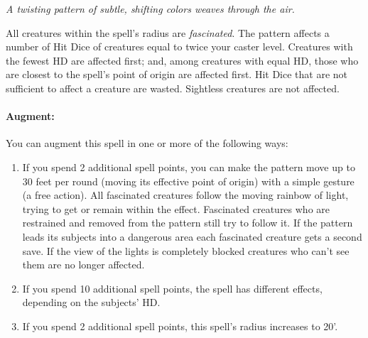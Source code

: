 \emph{A twisting pattern of subtle, shifting colors weaves through the air.}

All creatures within the spell's radius are \emph{fascinated}. 
The pattern affects a number of Hit Dice of creatures equal to twice your caster level. 
Creatures with the fewest HD are affected first; and, among creatures with equal HD, those who are closest to the spell's point of origin are affected first. 
Hit Dice that are not sufficient to affect a creature are wasted. 
Sightless creatures are not affected.

\paragraph{Augment:} You can augment this spell in one or more of the following ways:
\begin{enumerate}
 \item If you spend 2 additional spell points, you can make the pattern move up to 30 feet per round (moving its effective point of origin) with a simple gesture (a free action). 
All fascinated creatures follow the moving rainbow of light, trying to get or remain within the effect. 
Fascinated creatures who are restrained and removed from the pattern still try to follow it. 
If the pattern leads its subjects into a dangerous area each fascinated creature gets a second save. 
If the view of the lights is completely blocked creatures who can't see them are no longer affected.
 \item If you spend 10 additional spell points, the spell has different effects, depending on the subjects' HD.
 \item If you spend 2 additional spell points, this spell's radius increases to 20'.
\end{enumerate}

